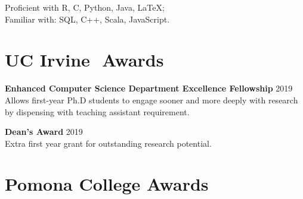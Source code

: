 \documentclass[margin]{res}
\begin{document}
\begin{resume}
Proficient with R, C, Python, Java, \LaTeX;\\ Familiar with:  SQL, C++, Scala, JavaScript.

%
%

 

\section{UC Irvine\,\, Awards}

\textbf{Enhanced Computer Science Department Excellence Fellowship} \hfill 2019\\
Allows first-year Ph.D students to engage sooner and more deeply with research by dispensing with teaching assistant requirement.

\textbf{Dean's Award} \hfill 2019\\
Extra first year grant for outstanding research potential.


\section{Pomona College Awards}


\end{resume}
\end{document}
